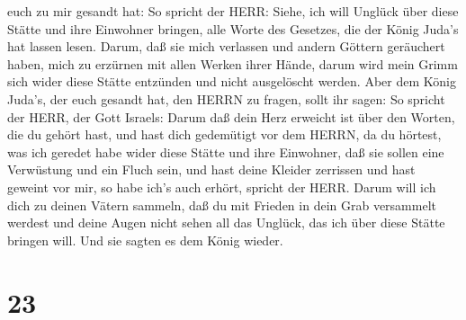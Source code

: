 euch zu mir gesandt hat:  So spricht der HERR: Siehe, ich
will Unglück über diese Stätte und ihre Einwohner bringen, alle Worte
des Gesetzes, die der König Juda's hat lassen lesen. 
Darum, daß sie mich verlassen und andern Göttern geräuchert haben, mich
zu erzürnen mit allen Werken ihrer Hände, darum wird mein Grimm sich
wider diese Stätte entzünden und nicht ausgelöscht werden. 
Aber dem König Juda's, der euch gesandt hat, den HERRN zu fragen, sollt
ihr sagen: So spricht der HERR, der Gott Israels:  Darum
daß dein Herz erweicht ist über den Worten, die du gehört hast, und hast
dich gedemütigt vor dem HERRN, da du hörtest, was ich geredet habe wider
diese Stätte und ihre Einwohner, daß sie sollen eine Verwüstung und ein
Fluch sein, und hast deine Kleider zerrissen und hast geweint vor mir,
so habe ich's auch erhört, spricht der HERR.  Darum will
ich dich zu deinen Vätern sammeln, daß du mit Frieden in dein Grab
versammelt werdest und deine Augen nicht sehen all das Unglück, das ich
über diese Stätte bringen will. Und sie sagten es dem König wieder.

\hypertarget{section-22}{%
\section{23}\label{section-22}}

